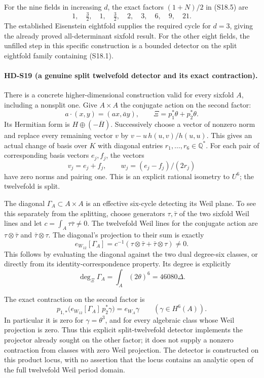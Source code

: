 For the nine fields in increasing \(d\), the exact factors
\((1+N)/2\) in (S18.5) are
\[
 1,\quad\tfrac32,\quad1,\quad\tfrac32,\quad2,
 \quad3,\quad6,\quad9,\quad21.
\]
The established Eisenstein eightfold supplies the required cycle
for \(d=3\), giving the already proved all-determinant sixfold
result. For the other eight fields, the unfilled step in this
specific construction is a bounded detector on the split
eightfold family containing (S18.1).

\paragraph{HD-S19 (a genuine split twelvefold detector and its exact contraction).}
There is a concrete higher-dimensional construction valid for every
sixfold \(A\), including a nonsplit one. Give \(A\times A\) the
conjugate action on the second factor:
\[
 a\cdot(x,y)=(ax,\bar a y),\qquad
 \Xi=p_1^*\theta+p_2^*\theta.
\]
Its Hermitian form is \(H\oplus(-\overline H)\).
Successively choose a vector of nonzero norm and replace every
remaining vector \(v\) by \(v-u\,h(u,v)/h(u,u)\).
This gives an actual change of basis over \(K\) with diagonal
entries \(r_1,\ldots,r_6\in\mathbb Q^*\).
For each pair of corresponding basis vectors \(e_j,f_j\),
the vectors
\[
 v_j=e_j+f_j,\qquad
 w_j=(e_j-f_j)/(2r_j)
\]
have zero norms and pairing one. This is an explicit rational
isometry to \(U^6\); the twelvefold is split.

The diagonal \(\Gamma_A\subset A\times A\) is an effective
six-cycle detecting its Weil plane. To see this separately from
the splitting, choose generators \(\tau,\bar\tau\) of the two
sixfold Weil lines and let \(c=\int_A\tau\bar\tau\ne0\).
The twelvefold Weil lines for the conjugate action are
\(\tau\otimes\bar\tau\) and
\(\bar\tau\otimes\tau\). The diagonal's projection to their
sum is exactly
\[
 e_{W_{12}}[\Gamma_A]
  =c^{-1}(\tau\otimes\bar\tau+\bar\tau\otimes\tau)\ne0.
                                                               \tag{S19.1}
\]
This follows by evaluating the diagonal against the two dual
degree-six classes, or directly from its identity-correspondence
property. Its degree is explicitly
\[
 \deg_\Xi\Gamma_A=\int_A(2\theta)^6
                 =46080\Delta.                          \tag{S19.2}
\]

The exact contraction on the second factor is
\[
 p_{1,*}\bigl(e_{W_{12}}[\Gamma_A]\,p_2^*\gamma\bigr)
       =e_{W_A}\gamma\qquad(\gamma\in H^6(A)).             \tag{S19.3}
\]
In particular it is zero for \(\gamma=\theta^3\), and for
every algebraic class whose Weil projection is zero. Thus this
explicit split-twelvefold detector implements the projector
already sought on the other factor; it does not supply a
nonzero contraction from classes with zero Weil projection.
The detector is constructed on this product locus, with no
assertion that the locus contains an analytic open of the full
twelvefold Weil period domain.

